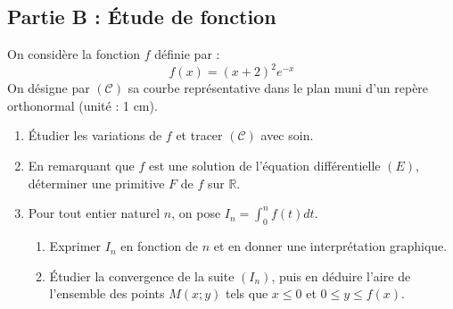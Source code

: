 \subsection*{Partie B : Étude de fonction}
On considère la fonction $f$ définie par :
\begin{equation*}
	f(x) = (x+2)^{2}e^{-x}
\end{equation*}
On désigne par $(\mathcal{C})$ sa courbe représentative dans le plan muni d'un repère orthonormal (unité : 1 cm).
\begin{enumerate}
	\item Étudier les variations de $f$ et tracer $(\mathcal{C})$ avec soin.
	\item En remarquant que $f$ est une solution de l'équation différentielle $(E)$, déterminer une primitive $F$ de $f$ sur $\mathbb{R}$.
	\item Pour tout entier naturel $n$, on pose $I_{n} = \int_{0}^{n} f(t)dt$.
	\begin{enumerate}
		\item Exprimer $I_{n}$ en fonction de $n$ et en donner une interprétation graphique.
		\item Étudier la convergence de la suite $(I_{n})$, puis en déduire l'aire de l'ensemble des points $M(x;y)$ tels que $x \le 0$ et $0 \le y \le f(x)$.
	\end{enumerate}
\end{enumerate}

